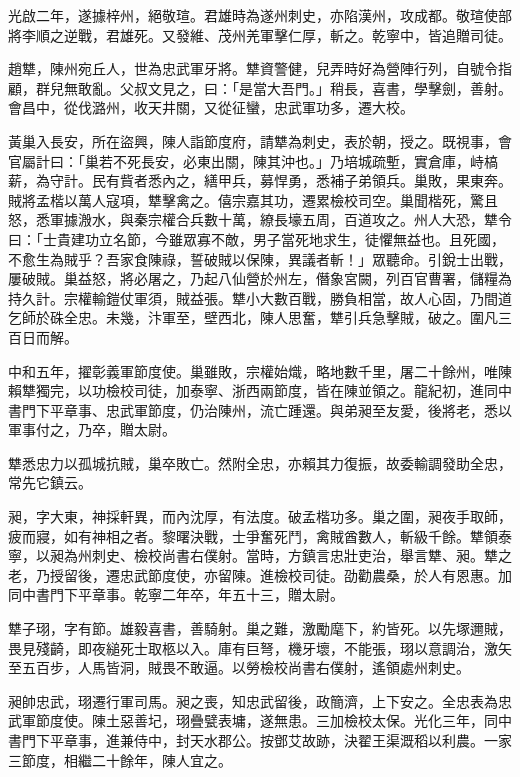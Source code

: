 \begin{pinyinscope}
 光啟二年，遂據梓州，絕敬瑄。君雄時為遂州刺史，亦陷漢州，攻成都。敬瑄使部將李順之逆戰，君雄死。又發維、茂州羌軍擊仁厚，斬之。乾寧中，皆追贈司徒。



 趙犨，陳州宛丘人，世為忠武軍牙將。犨資警健，兒弄時好為營陣行列，自號令指顧，群兒無敢亂。父叔文見之，曰：「是當大吾門。」稍長，喜書，學擊劍，善射。會昌中，從伐潞州，收天井關，又從征蠻，忠武軍功多，遷大校。



 黃巢入長安，所在盜興，陳人詣節度府，請犨為刺史，表於朝，授之。既視事，會官屬計曰：「巢若不死長安，必東出關，陳其沖也。」乃培城疏塹，實倉庫，峙槁薪，為守計。民有貲者悉內之，繕甲兵，募悍勇，悉補子弟領兵。巢敗，果東奔。賊將孟楷以萬人寇項，犨擊禽之。僖宗嘉其功，遷累檢校司空。巢聞楷死，驚且怒，悉軍據溵水，與秦宗權合兵數十萬，繚長壕五周，百道攻之。州人大恐，犨令曰：「士貴建功立名節，今雖眾寡不敵，男子當死地求生，徒懼無益也。且死國，不愈生為賊乎？吾家食陳祿，誓破賊以保陳，異議者斬！」眾聽命。引銳士出戰，屢破賊。巢益怒，將必屠之，乃起八仙營於州左，僭象宮闕，列百官曹署，儲糧為持久計。宗權輸鎧仗軍須，賊益張。犨小大數百戰，勝負相當，故人心固，乃間道乞師於硃全忠。未幾，汴軍至，壁西北，陳人思奮，犨引兵急擊賊，破之。圍凡三百日而解。



 中和五年，擢彰義軍節度使。巢雖敗，宗權始熾，略地數千里，屠二十餘州，唯陳賴犨獨完，以功檢校司徒，加泰寧、浙西兩節度，皆在陳並領之。龍紀初，進同中書門下平章事、忠武軍節度，仍治陳州，流亡踵還。與弟昶至友愛，後將老，悉以軍事付之，乃卒，贈太尉。



 犨悉忠力以孤城抗賊，巢卒敗亡。然附全忠，亦賴其力復振，故委輸調發助全忠，常先它鎮云。



 昶，字大東，神採軒異，而內沈厚，有法度。破孟楷功多。巢之圍，昶夜手取師，疲而寢，如有神相之者。黎曙決戰，士爭奮死鬥，禽賊酋數人，斬級千餘。犨領泰寧，以昶為州刺史、檢校尚書右僕射。當時，方鎮言忠壯吏治，舉言犨、昶。犨之老，乃授留後，遷忠武節度使，亦留陳。進檢校司徒。劭勸農桑，於人有恩惠。加同中書門下平章事。乾寧二年卒，年五十三，贈太尉。



 犨子珝，字有節。雄毅喜書，善騎射。巢之難，激勵麾下，約皆死。以先塚邇賊，畏見殘齮，即夜縋死士取柩以入。庫有巨弩，機牙壞，不能張，珝以意調治，激矢至五百步，人馬皆洞，賊畏不敢逼。以勞檢校尚書右僕射，遙領處州刺史。



 昶帥忠武，珝遷行軍司馬。昶之喪，知忠武留後，政簡濟，上下安之。全忠表為忠武軍節度使。陳土惡善圮，珝疊甓表墉，遂無患。三加檢校太保。光化三年，同中書門下平章事，進兼侍中，封天水郡公。按鄧艾故跡，決翟王渠溉稻以利農。一家三節度，相繼二十餘年，陳人宜之。




\end{pinyinscope}
